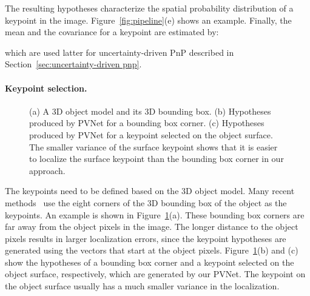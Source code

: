 \documentclass[10pt,twocolumn,letterpaper]{article}
\begin{document}
The resulting hypotheses characterize the spatial probability distribution of a keypoint in the image. Figure~\ref{fig:pipeline}(e) shows an example.  
Finally, the mean  and the covariance  for a keypoint  are estimated by:




which are used latter for uncertainty-driven PnP described in Section~\ref{sec:uncertainty-driven pnp}.



\paragraph{Keypoint selection.}
\label{sec:keypoint selection}

\begin{figure} 
  \centering 
  \vspace{2mm}
  \caption{(a) A 3D object model and its 3D bounding box. (b) Hypotheses produced by PVNet for a bounding box corner. (c) Hypotheses produced by PVNet for a keypoint selected on the object surface. The smaller variance of the surface keypoint shows that it is easier to localize the surface keypoint than the bounding box corner in our approach.
}
  \label{fig:keypoints_selection}
  \vspace{-4mm}
\end{figure}
 
The keypoints need to be defined based on the 3D object model. Many recent methods~\cite{rad2017bb8, tekin2018real, oberweger2018making} use the eight corners of the 3D bounding box of the object as the keypoints. An example is shown in Figure~\ref{fig:keypoints_selection}(a). These bounding box corners are far away from the object pixels in the image. 
The longer distance to the object pixels results in larger localization errors, since the keypoint hypotheses are generated using the vectors that start at the object pixels.
Figure~\ref{fig:keypoints_selection}(b) and (c) show the hypotheses of a bounding box corner and a keypoint selected on the object surface, respectively, which are generated by our PVNet. The keypoint on the object surface usually has a much smaller variance in the localization. 
\end{document}
